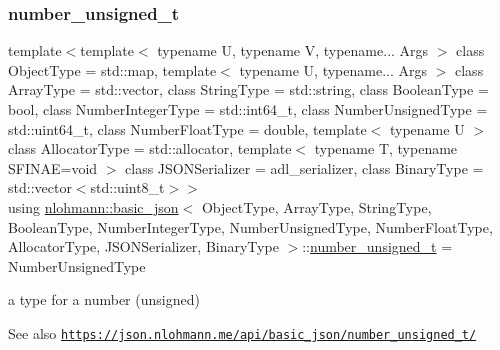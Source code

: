 \subsubsection{\texorpdfstring{number\+\_\+unsigned\+\_\+t}{number\_unsigned\_t}}
{\footnotesize\ttfamily template$<$template$<$ typename U, typename V, typename... Args $>$ class Object\+Type = std\+::map, template$<$ typename U, typename... Args $>$ class Array\+Type = std\+::vector, class String\+Type  = std\+::string, class Boolean\+Type  = bool, class Number\+Integer\+Type  = std\+::int64\+\_\+t, class Number\+Unsigned\+Type  = std\+::uint64\+\_\+t, class Number\+Float\+Type  = double, template$<$ typename U $>$ class Allocator\+Type = std\+::allocator, template$<$ typename T, typename S\+F\+I\+N\+A\+E=void $>$ class J\+S\+O\+N\+Serializer = adl\+\_\+serializer, class Binary\+Type  = std\+::vector$<$std\+::uint8\+\_\+t$>$$>$ \\
using \hyperlink{classnlohmann_1_1basic__json}{nlohmann\+::basic\+\_\+json}$<$ Object\+Type, Array\+Type, String\+Type, Boolean\+Type, Number\+Integer\+Type, Number\+Unsigned\+Type, Number\+Float\+Type, Allocator\+Type, J\+S\+O\+N\+Serializer, Binary\+Type $>$\+::\hyperlink{classnlohmann_1_1basic__json_ae09af9c23351b7245d9be4d1b2035fef}{number\+\_\+unsigned\+\_\+t} =  Number\+Unsigned\+Type}



a type for a number (unsigned) 

\begin{DoxySeeAlso}{See also}
\href{https://json.nlohmann.me/api/basic_json/number_unsigned_t/}{\tt https\+://json.\+nlohmann.\+me/api/basic\+\_\+json/number\+\_\+unsigned\+\_\+t/} 
\end{DoxySeeAlso}
\mbox{\label{classnlohmann_1_1basic__json_ac26c2e8d6bcaccde372ceedd81851200}} 
